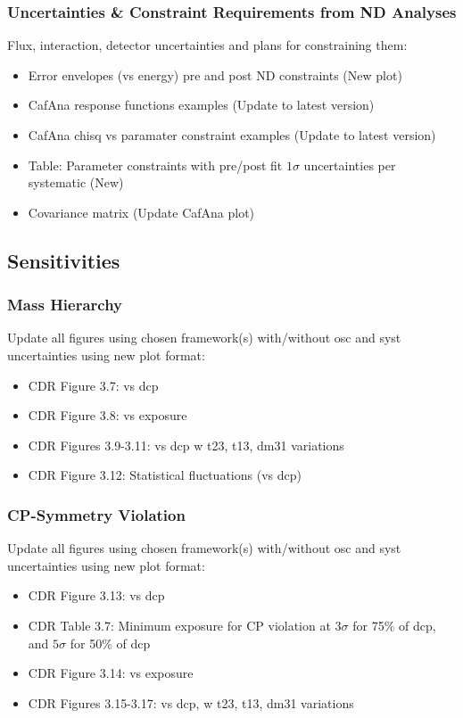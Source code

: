 \subsubsection{Uncertainties \& Constraint Requirements from ND Analyses}
Flux, interaction, detector uncertainties and plans for constraining them:
\begin{itemize}
\item Error envelopes (vs energy) pre and post ND constraints (New plot)
\item CafAna response functions examples (Update to latest version)
\item CafAna chisq vs paramater constraint examples (Update to latest version)
\item Table: Parameter constraints with pre/post fit $1\sigma$ uncertainties per systematic (New)
\item Covariance matrix (Update CafAna plot)
\end{itemize}

\subsection{Sensitivities}
\subsubsection{Mass Hierarchy}
Update all figures using chosen framework(s) with/without osc and syst uncertainties using new plot format:
\begin{itemize}
\item CDR Figure 3.7: vs dcp
\item CDR Figure 3.8: vs exposure
\item CDR Figures 3.9-3.11: vs dcp w t23, t13, dm31 variations
\item CDR Figure 3.12: Statistical fluctuations (vs dcp)
\end{itemize}

\subsubsection{CP-Symmetry Violation}
Update all figures using chosen framework(s) with/without osc and syst uncertainties using new plot format:
\begin{itemize}
	\item CDR Figure 3.13: vs dcp
	\item CDR Table 3.7: Minimum exposure for CP violation at $3\sigma$ for 75\% of dcp, and $5\sigma$ for 50\% of dcp
	\item CDR Figure 3.14: vs exposure
	\item CDR Figures 3.15-3.17: vs dcp, w t23, t13, dm31 variations
\end{itemize}

